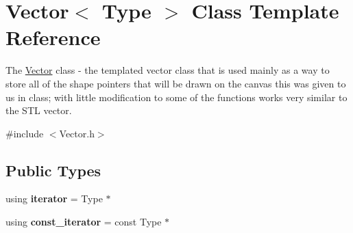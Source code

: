 \hypertarget{class_vector}{}\section{Vector$<$ Type $>$ Class Template Reference}
\label{class_vector}


The \hyperlink{class_vector}{Vector} class -\/ the templated vector class that is used mainly as a way to store all of the shape pointers that will be drawn on the canvas this was given to us in class; with little modification to some of the functions works very similar to the S\+TL vector.  




{\ttfamily \#include $<$Vector.\+h$>$}

\subsection*{Public Types}
\begin{DoxyCompactItemize}
\item 
\mbox{\label{class_vector_a192547a2a73f8cfafc6bbf8bad4484bc}} 
using {\bfseries iterator} = Type $\ast$
\item 
\mbox{\label{class_vector_ac26885176589bc18e98f69b6917aee51}} 
using {\bfseries const\+\_\+iterator} = const Type $\ast$
\end{DoxyCompactItemize}

